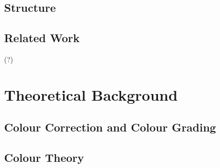\documentclass[12pt,a4paper]{article}
\begin{document}
\subsection{Structure}










\subsection{Related Work} 

\cite{frida} (?)





%
%
%
%
%
%
%
%
\newpage
\section{Theoretical Background} \label{section:theoreticalbackground}



\subsection{Colour Correction and Colour Grading}











\subsection{Colour Theory}
\end{document}
